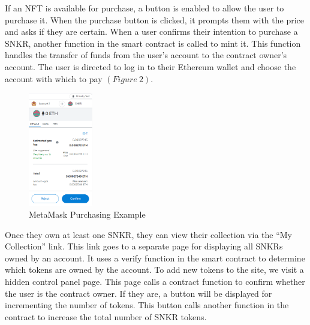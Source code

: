 \documentclass{article}
\begin{document}
    If an NFT is available for purchase, a button is enabled to allow the user to purchase it.
    When the purchase button is clicked, it prompts them with the price and asks if they are certain.
    When a user confirms their intention to purchase a SNKR, another function in the smart contract is called to mint it.
    This function handles the transfer of funds from the user's account to the contract owner's account.
    The user is directed to log in to their Ethereum wallet and choose the account with which to pay $( Figure~2 )$.
    
\begin{figure}[!h]
    \centering
    \includegraphics[width=0.25\textwidth]{MetaMaskPurchasing.png}
    \caption{MetaMask Purchasing Example}
\end{figure}

    Once they own at least one SNKR, they can view their collection via the ``My Collection'' link.
    This link goes to a separate page for displaying all SNKRs owned by an account.
    It uses a verify function in the smart contract to determine which tokens are owned by the account.
    \newline
    To add new tokens to the site, we visit a hidden control panel page. 
    This page calls a contract function to confirm whether the user is the contract owner.
    If they are, a button will be displayed for incrementing the number of tokens.
    This button calls another function in the contract to increase the total number of SNKR tokens.
    
    
\end{document}
